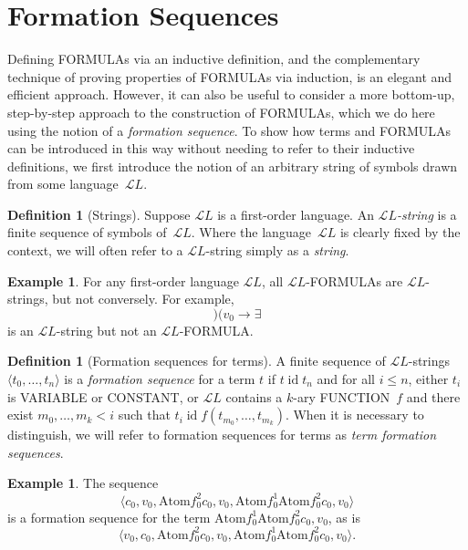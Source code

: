 \documentclass[10pt,a4paper]{article}
\newcommand*{\olup}[1]{\MakeUppercase{#1}}
\theoremstyle{plain}
\theoremstyle{definition}
\newtheorem{defn}[thm]{Definition}
\newtheorem{ex}[thm]{Example}
\theoremstyle{remark}
\newcommand*{\olfileid}[3]{}
\newcommand*{\olsection}[1]{\section*{#1}}
\newcommand*{\ollabel}[1]{\label{#1}}
\providecommand{\lif}{\mathbin{\rightarrow}}
\providecommand{\lexists}{\mathord{\exists}}
\providecommand{\Obj}{}
\providecommand{\Lang}{\ensuremath{\mathcal{L}}}
\providecommand{\tuple}[1]{\langle #1 \rangle}
\providecommand{\Atom}{\mathrm{Atom}}
\providecommand{\ident}{\operatorname{id}}
\begin{document}
\olfileid{fol}{syn}{fseq}

\olsection{Formation Sequences}

Defining \olup{formula}s via an inductive definition, and the
complementary technique of proving properties of \olup{formula}s via
induction, is an elegant and efficient approach. However, it can
also be useful to consider a more bottom-up, step-by-step approach
to the construction of \olup{formula}s, which we do here using the
notion of a \emph{formation sequence}.
%
To show how terms and \olup{formula}s can be introduced in this way
without needing to refer to their inductive definitions, we first
introduce the notion of an arbitrary string of symbols drawn from
some language~$\Lang L$.

\begin{defn}[Strings]
\ollabel{defn:string}
Suppose $\Lang L$ is a first-order language. An \emph{$\Lang
L$-string} is a finite sequence of symbols of~$\Lang L$. Where the
language~$\Lang L$ is clearly fixed by the context, we will often
refer to a $\Lang L$-string simply as a \emph{string}.
\end{defn}

\begin{ex}
For any first-order language $\Lang L$, all
$\Lang L$-\olup{formula}s are $\Lang L$-strings, but not
conversely. For example, \[)(\Obj v_0\lif\lexists\] is an
$\Lang L$-string but not an $\Lang L$-\olup{formula}.
\end{ex}

\begin{defn}[Formation sequences for terms]
\ollabel{defn:fseq-trm}
A finite sequence of $\Lang L$-strings $\tuple{t_0,\dotsc,t_n}$ is a
\emph{formation sequence} for a term $t$ if $t \ident t_n$ and for all
$i \leq n$, either $t_i$ is \olup{variable} or \olup{constant}, or $\Lang
L$ contains a $k$-ary \olup{function}~$f$ and there exist
$m_0,\dotsc,m_k < i$ such that $t_i \ident f(t_{m_0},\dotsc,t_{m_k})$.
When it is necessary to distinguish, we will refer to formation
sequences for terms as \emph{term formation sequences}.
\end{defn}

\begin{ex}
The sequence
\[
    \tuple{\Obj c_0, \Obj v_0, \Atom{\Obj f^2_0}{\Obj c_0, \Obj v_0}, \Atom{\Obj f^1_0}{\Atom{\Obj f^2_0}{\Obj c_0, \Obj v_0}}}
\]
is a formation sequence for the term $\Atom{\Obj f^1_0}{\Atom{\Obj
f^2_0}{\Obj c_0, \Obj v_0}}$, as is
\[
    \tuple{\Obj v_0, \Obj c_0, \Atom{\Obj f^2_0}{\Obj c_0, \Obj v_0}, \Atom{\Obj f^1_0}{\Atom{\Obj f^2_0}{\Obj c_0, \Obj v_0}}}.
\]
\end{ex}
\end{document}
